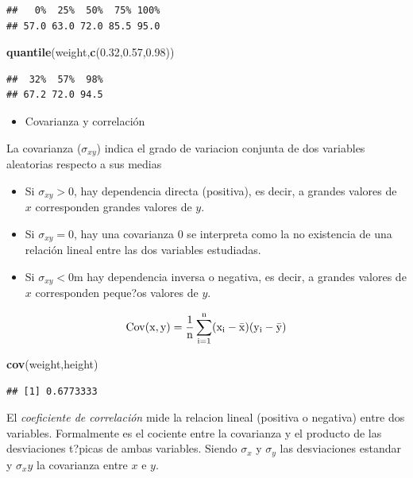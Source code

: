 \documentclass[]{book}
\newenvironment{Shaded}{\begin{snugshade}}{\end{snugshade}}
\newcommand{\KeywordTok}[1]{\textcolor[rgb]{0.13,0.29,0.53}{\textbf{#1}}}
\newcommand{\FloatTok}[1]{\textcolor[rgb]{0.00,0.00,0.81}{#1}}
\newcommand{\NormalTok}[1]{#1}
\providecommand{\tightlist}{%
  \setlength{\itemsep}{0pt}\setlength{\parskip}{0pt}}
\begin{document}
\begin{verbatim}
##   0%  25%  50%  75% 100% 
## 57.0 63.0 72.0 85.5 95.0
\end{verbatim}

\begin{Shaded}
\begin{Highlighting}[]
\KeywordTok{quantile}\NormalTok{(weight,}\KeywordTok{c}\NormalTok{(}\FloatTok{0.32}\NormalTok{,}\FloatTok{0.57}\NormalTok{,}\FloatTok{0.98}\NormalTok{))}
\end{Highlighting}
\end{Shaded}

\begin{verbatim}
##  32%  57%  98% 
## 67.2 72.0 94.5
\end{verbatim}

\begin{itemize}
\tightlist
\item
  Covarianza y correlación
\end{itemize}

La covarianza (\(\sigma_{xy}\)) indica el grado de variacion conjunta de
dos variables aleatorias respecto a sus medias

\begin{itemize}
\tightlist
\item
  Si \(\sigma_{xy}> 0\), hay dependencia directa (positiva), es decir, a
  grandes valores de \(x\) corresponden grandes valores de \(y\).
\item
  Si \(\sigma_{xy}= 0\), hay una covarianza 0 se interpreta como la no
  existencia de una relación lineal entre las dos variables estudiadas.
\item
  Si \(\sigma_{xy}< 0\)m hay dependencia inversa o negativa, es decir, a
  grandes valores de \(x\) corresponden peque?os valores de \(y\).
\end{itemize}

\[
\rm{Cov}(x,y) = \frac{1}{n}\sum_{i=1}^{n}(x_i - \bar{x})(y_i - \bar{y})
\]

\begin{Shaded}
\begin{Highlighting}[]
\KeywordTok{cov}\NormalTok{(weight,height)}
\end{Highlighting}
\end{Shaded}

\begin{verbatim}
## [1] 0.6773333
\end{verbatim}

El \emph{coeficiente de correlación} mide la relacion lineal (positiva o
negativa) entre dos variables. Formalmente es el cociente entre la
covarianza y el producto de las desviaciones t?picas de ambas variables.
Siendo \(\sigma_x\) y \(\sigma_y\) las desviaciones estandar y
\(\sigma_xy\) la covarianza entre \(x\) e \(y\).
\end{document}
